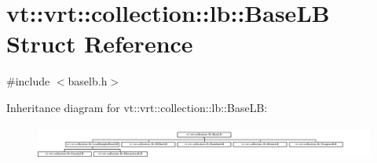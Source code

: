 \hypertarget{structvt_1_1vrt_1_1collection_1_1lb_1_1_base_l_b}{}\section{vt\+:\+:vrt\+:\+:collection\+:\+:lb\+:\+:Base\+LB Struct Reference}
\label{structvt_1_1vrt_1_1collection_1_1lb_1_1_base_l_b}


{\ttfamily \#include $<$baselb.\+h$>$}

Inheritance diagram for vt\+:\+:vrt\+:\+:collection\+:\+:lb\+:\+:Base\+LB\+:\begin{figure}[H]
\begin{center}
\leavevmode
\includegraphics[height=1.120000cm]{structvt_1_1vrt_1_1collection_1_1lb_1_1_base_l_b}
\end{center}
\end{figure}
